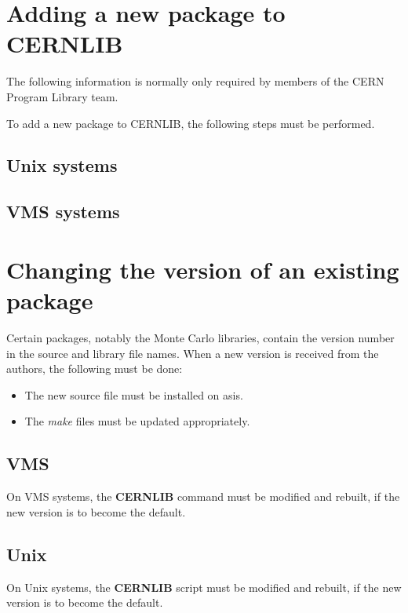 \chapter{Adding a new package to CERNLIB}

The following information is normally only required by members
of the CERN Program Library team. 

To add a new package to CERNLIB, the following steps must be
performed.

\section{Unix systems}

\section{VMS systems}

\chapter{Changing the version of an existing package}


Certain packages, notably the Monte Carlo libraries, contain
the version number in the source and library file names. When
a new version is received from the authors, the following 
must be done:

\begin{itemize}
\item
The new source file must be installed on asis.
\item
The {\it make} files must be updated appropriately.
\end{itemize}

\section{VMS}


On VMS systems, the {\bf CERNLIB} command must be modified and
rebuilt, if the new version is to become the default.

\section{Unix}

On Unix systems, the {\bf CERNLIB} script must be modified and
rebuilt, if the new version is to become the default.

